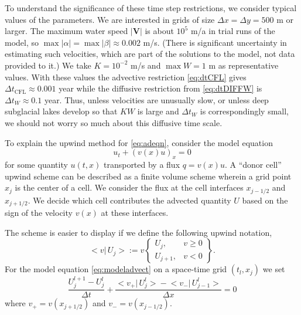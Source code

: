 \documentclass[11pt,final]{amsart}%
\newcommand\bV{\mathbf{V}}
\begin{document}
To understand the significance of these time step restrictions, we consider typical values of the parameters.  We are interested in grids of size $\Delta x = \Delta y = 500$ m or larger.  The maximum water speed $|\bV|$ is about $10^5$ m/a in trial runs of the model, so $\max |\alpha| = \max |\beta| \approx 0.002$ m/s.  (There is significant uncertainty in estimating such velocities, which are part of the solutions to the model, not data provided to it.)  We take $K=10^{-2}$ m/s and $\max W=1$ m as representative values.  With these values the advective restriction \eqref{eq:dtCFL} gives $\Delta t_{\text{CFL}} \approx 0.001$ year while the diffusive restriction from \eqref{eq:dtDIFFW} is $\Delta t_W \approx 0.1$ year.  Thus, unless velocities are unusually slow, or unless deep subglacial lakes develop so that $KW$ is large and $\Delta t_W$ is correspondingly small, we should not worry so much about this diffusive time scale.

To explain the upwind method for \eqref{eq:adeqn}, consider the model equation
\begin{equation} \label{eq:modeladvect}
u_t + (v(x) u)_x = 0
\end{equation}
for some quantity $u(t,x)$ transported by a flux $q = v(x) u$.  A ``donor cell'' upwind scheme can be described as a finite volume scheme \citep{LeVeque} wherein a grid point $x_j$ is the center of a cell.  We consider the flux at the cell interfaces $x_{j-1/2}$ and $x_{j+1/2}$.  We decide which cell contributes the advected quantity $U$ based on the sign of the velocity $v(x)$ at these interfaces.

The scheme is easier to display if we define the following upwind notation,
\newcommand{\up}[2]{\big<#1\big|\,#2\big>}
	$$\up{v}{U_j} := v \begin{Bmatrix} U_j, & v \ge 0 \\ U_{j+1}, & v < 0 \end{Bmatrix}.$$
For the model equation \eqref{eq:modeladvect} on a space-time grid $(t_l,x_j)$ we set
\begin{equation}\label{eq:modelfdadvect}
\frac{U_j^{l+1} - U_j^l}{\Delta t} + \frac{\up{v_+}{U_j^l} - \up{v_-}{U_{j-1}^l}}{\Delta x} = 0
\end{equation}
where $v_+ = v(x_{j+1/2})$ and $v_-=v(x_{j-1/2})$.
\end{document}
